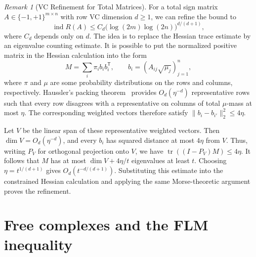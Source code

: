 \documentclass[11pt]{article}
\theoremstyle{remark}
\newtheorem{remark}[theorem]{Remark}
\begin{document}
\begin{remark}[VC Refinement for Total Matrices]\label{rem:refinement}
For a total sign matrix $A\in\{-1,+1\}^{m\times n}$ with row
VC dimension $d\geq1$, we can refine the bound to
\[
 \operatorname{ind} R(A)
 \leq C_d\bigl(\log(2m)\log(2n)\bigr)^{d/(d+1)},
\]
where $C_d$ depends only on $d$.
The idea is to replace the Hessian trace estimate by an eigenvalue
counting estimate. It is possible to put the normalized positive matrix in the Hessian
calculation into the form
\[
 M=\sum_i\pi_i b_i b_i^{\mathsf T},
 \qquad b_i=(A_{ij}\sqrt{\mu_j})_{j=1}^n,
\]
where $\pi$ and $\mu$ are some probability distributions on the rows and
columns, respectively. Haussler's packing theorem~\cite{Haussler1995}
provides $O_d(\eta^{-d})$ representative rows such that every row
disagrees with a representative on columns of total $\mu$-mass
at most $\eta$. The corresponding weighted vectors therefore
satisfy $\lVert b_i-b_{i'}\rVert_2^2\leq4\eta$.

Let $V$ be the linear span of these representative weighted vectors.
Then $\dim V=O_d(\eta^{-d})$, and every $b_i$ has squared distance
at most $4\eta$ from $V$. Thus, writing $P_V$ for orthogonal
projection onto $V$, we have
$\operatorname{tr}((I-P_V)M)\leq4\eta$.
It follows that $M$ has at most $\dim V+4\eta/t$ eigenvalues
at least $t$. Choosing $\eta=t^{1/(d+1)}$ gives
$O_d(t^{-d/(d+1)})$. Substituting this estimate into the
constrained Hessian calculation and applying the same
Morse-theoretic argument proves the refinement.
\end{remark}


\section{Free complexes and the FLM inequality}\label{sec:complexes}
\end{document}
